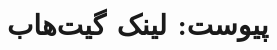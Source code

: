 \section{پیوست: لینک گیت‌هاب}

\href{https://github.com/amirmohammadzaker/Mathematical-Software-Course}{}
